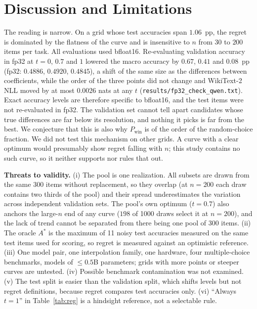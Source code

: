 \documentclass[conference]{IEEEtran}
\begin{document}
\section{Discussion and Limitations}
The reading is narrow. On a grid whose test accuracies span $1.06$~pp, the regret is dominated by the flatness of the curve and is insensitive to $n$ from $30$ to $200$ items per task. All evaluations used bfloat16. Re-evaluating validation accuracy in fp32 at $t=0$, $0.7$ and $1$ lowered the macro accuracy by $0.67$, $0.41$ and $0.08$~pp (fp32: $0.4886$, $0.4920$, $0.4845$), a shift of the same size as the differences between coefficients, while the order of the three points did not change and WikiText-2 NLL moved by at most $0.0026$ nats at any $t$ (\texttt{results/fp32\_check\_qwen.txt}). Exact accuracy levels are therefore specific to bfloat16, and the test items were not re-evaluated in fp32. The validation set cannot tell apart candidates whose true differences are far below its resolution, and nothing it picks is far from the best. We conjecture that this is also why $P_{\mathrm{win}}$ is of the order of the random-choice fraction. We did not test this mechanism on other grids. A curve with a clear optimum would presumably show regret falling with $n$; this study contains no such curve, so it neither supports nor rules that out.

\textbf{Threats to validity.} (i) The pool is one realization. All subsets are drawn from the same 300 items without replacement, so they overlap (at $n=200$ each draw contains two thirds of the pool) and their spread underestimates the variation across independent validation sets. The pool's own optimum ($t=0.7$) also anchors the large-$n$ end of any curve ($198$ of 1000 draws select it at $n=200$), and the lack of trend cannot be separated from there being one pool of 300 items. (ii) The oracle $A^\ast$ is the maximum of 11 noisy test accuracies measured on the same test items used for scoring, so regret is measured against an optimistic reference. (iii) One model pair, one interpolation family, one hardware, four multiple-choice benchmarks, models of $\le0.5$B parameters; grids with more points or steeper curves are untested. (iv) Possible benchmark contamination was not examined. (v) The test split is easier than the validation split, which shifts levels but not regret definitions, because regret compares test accuracies only. (vi) ``Always $t=1$'' in Table~\ref{tab:reg} is a hindsight reference, not a selectable rule.
\end{document}
